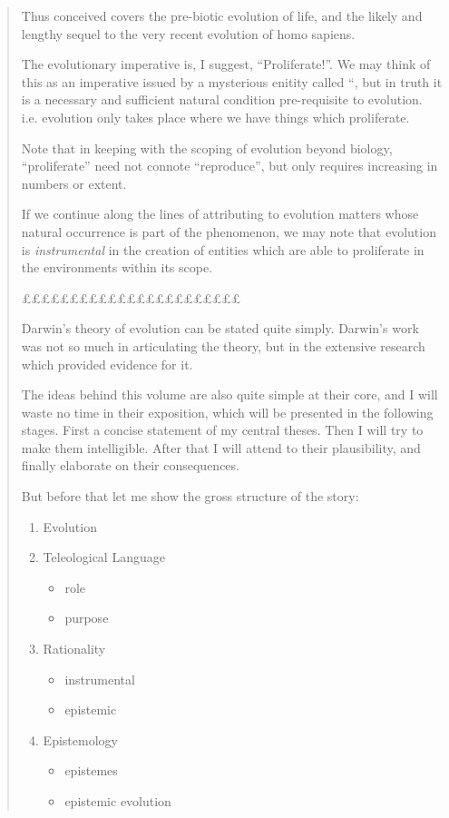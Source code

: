 {\begin{quote}
Thus conceived covers the pre-biotic evolution of life, and the likely and lengthy sequel to the very recent evolution of homo sapiens.

The evolutionary imperative is, I suggest, ``Proliferate!''.
We may think of this as an imperative issued by a mysterious enitity called ``, but in truth it is a necessary and sufficient natural condition pre-requisite to evolution.
i.e. evolution only takes place where we have things which proliferate.

Note that in keeping with the scoping of evolution beyond biology, ``proliferate'' need not connote ``reproduce'', but only requires increasing in numbers or extent.

If we continue along the lines of attributing to evolution matters whose natural occurrence is part of the phenomenon, we may note that evolution is \emph{instrumental} in the creation of entities which are able to proliferate in the environments within its scope.

£££££££££££££££££££££££


Darwin's theory of evolution can be stated quite simply.
Darwin's work was not so much in articulating the theory, but in the extensive research which provided evidence for it.

The ideas behind this volume are also quite simple at their core, and I will waste no time in their exposition, which will be presented in the following stages.
First a concise statement of my central theses.
Then I will try to make them intelligible.
After that I will attend to their plausibility, and finally elaborate on their consequences.

But before that let me show the gross structure of the story:

\begin{enumerate}
\item Evolution
\item Teleological Language
\begin{itemize}
\item role
\item purpose
\end{itemize}
\item Rationality
\begin{itemize}
\item instrumental
\item epistemic
\end{itemize}
\item Epistemology
\begin{itemize}
\item epistemes
\item epistemic evolution
\end{itemize}
\end{enumerate}


\end{quote}}
